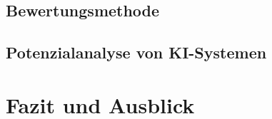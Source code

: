 \documentclass[a4paper,12pt, german]{report}
\begin{document}
\section{Bewertungsmethode}

\section{Potenzialanalyse von KI-Systemen}


\chapter{Fazit und Ausblick}

\listoffigures

\clearpage




\appendix
\end{document}
